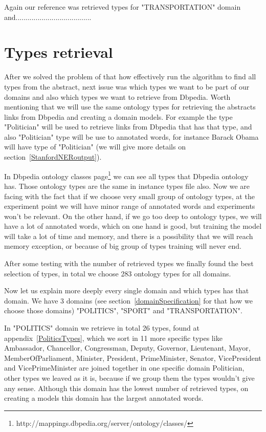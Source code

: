 \documentclass[thesis=M,english]{FITthesis}[2018/05/30]
\begin{document}
	Again our reference was retrieved types for "TRANSPORTATION" domain and......................................


\section{Types retrieval}\label{typesRetrieval}
After we solved the problem of that how effectively run the algorithm to find all types from the abstract, next issue was which types we want to be part of our domains and also which types we want to retrieve from Dbpedia. Worth mentioning that we will use the same ontology types for retrieving the abstracts links from Dbpedia and creating a domain models. For example the type "Politician" will be used to retrieve links from Dbpedia that has that type, and also "Politician" type will be use to annotated words, for instance Barack Obama will have type of "Politician" (we will give more details on section~\ref{StanfordNERoutput}).

In Dbpedia ontology classes page\footnote{http://mappings.dbpedia.org/server/ontology/classes/} we can see all types that Dbpedia ontology has. Those ontology types are the same in instance types file also. Now we are facing with the fact that if we choose very small group of ontology types, at the experiment point we will have minor range of annotated words and experiments won't be relevant. On the other hand, if we go too deep to ontology types, we will have a lot of annotated words, which on one hand is good, but training the model will take a lot of time and memory, and there is a possibility that we will reach memory exception, or because of big group of types training will never end.  

After some testing with the number of retrieved types we finally found the best selection of types, in total we choose 283 ontology types for all domains.

Now let us explain more deeply every single domain and which types has that domain. We have 3 domains (see section~\ref{domainSpecification} for that how we choose those domains) "POLITICS", "SPORT" and "TRANSPORTATION".

In "POLITICS" domain we retrieve in total 26 types, found at appendix~\ref{PoliticsTypes}, which we sort in 11 more specific types like Ambassador, Chancellor, Congressman, Deputy, Governor, Lieutenant, Mayor, MemberOfParliament, Minister, President, PrimeMinister, Senator, VicePresident and VicePrimeMinister are joined together in one specific domain Politician, other types we leaved as it is, because if we group them the types wouldn't give any sense. Although this domain has the lowest number of retrieved types, on creating a models this domain has the largest annotated words. 
\end{document}
